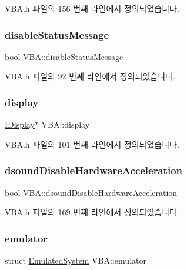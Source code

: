V\+B\+A.\+h 파일의 156 번째 라인에서 정의되었습니다.

\mbox{\label{class_v_b_a_a7bfea5ab60b19d26053b22ce070e2248}} 
\subsubsection{\texorpdfstring{disable\+Status\+Message}{disableStatusMessage}}
{\footnotesize\ttfamily bool V\+B\+A\+::disable\+Status\+Message}



V\+B\+A.\+h 파일의 92 번째 라인에서 정의되었습니다.

\mbox{\label{class_v_b_a_a940e5bad8b3ed2436888dbcd03bfd563}} 
\subsubsection{\texorpdfstring{display}{display}}
{\footnotesize\ttfamily \mbox{\hyperlink{class_i_display}{I\+Display}}$\ast$ V\+B\+A\+::display}



V\+B\+A.\+h 파일의 101 번째 라인에서 정의되었습니다.

\mbox{\label{class_v_b_a_a58f89c52283d10a0fcaac8abb7eca524}} 
\subsubsection{\texorpdfstring{dsound\+Disable\+Hardware\+Acceleration}{dsoundDisableHardwareAcceleration}}
{\footnotesize\ttfamily bool V\+B\+A\+::dsound\+Disable\+Hardware\+Acceleration}



V\+B\+A.\+h 파일의 169 번째 라인에서 정의되었습니다.

\mbox{\label{class_v_b_a_ab40fc008c6714c3c8670eb8a9085a4a1}} 
\subsubsection{\texorpdfstring{emulator}{emulator}}
{\footnotesize\ttfamily struct \mbox{\hyperlink{struct_emulated_system}{Emulated\+System}} V\+B\+A\+::emulator}



